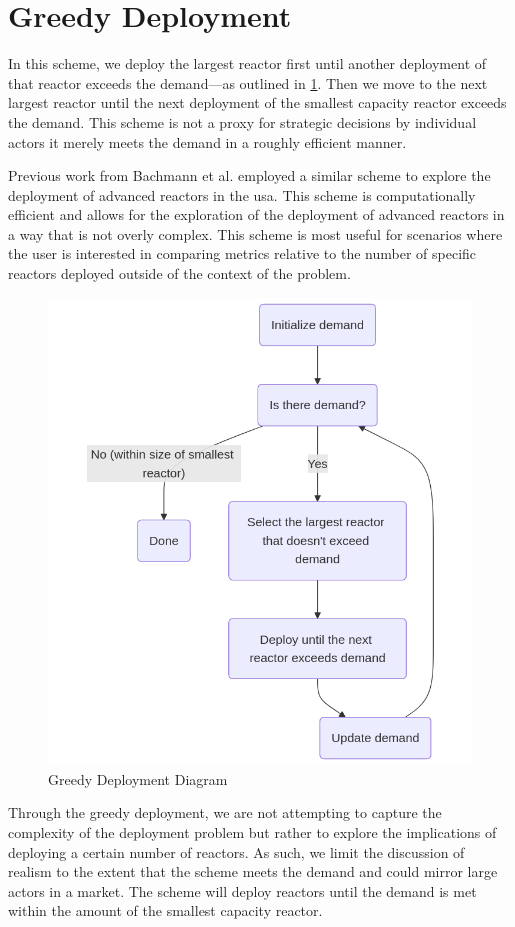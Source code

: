 \section{Greedy Deployment}
\label{sec:greedy_deployment}

In this scheme, we deploy the largest reactor first until another
deployment of that reactor exceeds the demand---as outlined in
\ref{fig:greedy_diagram}. Then we move to the next largest reactor until the
next deployment of the smallest capacity reactor exceeds the
demand. This scheme is not a proxy for strategic decisions by individual
actors it merely meets the demand in a roughly efficient manner.

Previous work from Bachmann et al. \cite{bachmann_enrichment_2021}
employed a similar scheme to explore the deployment of advanced
reactors in the \gls{usa}. This scheme is computationally efficient and allows
for the exploration of the deployment of advanced reactors in a way that is not
overly complex. This scheme is most useful for scenarios where the user is
interested in comparing metrics relative to the number of specific reactors
deployed outside of the context of the problem.

\begin{figure}[!htbp]
    \centering
    \includegraphics[scale=0.4]{images/schemes/greedy_diagram.png}
    \caption{Greedy Deployment Diagram}
    \label{fig:greedy_diagram}
\end{figure}

Through the greedy deployment, we are not attempting to capture the complexity
of the deployment problem but rather to explore the implications of deploying a
certain number of reactors. As such, we limit the discussion of realism to the
extent that the scheme meets the demand and could mirror large actors in a
market. The scheme will deploy reactors until the demand is met within the
amount of the smallest capacity reactor.

